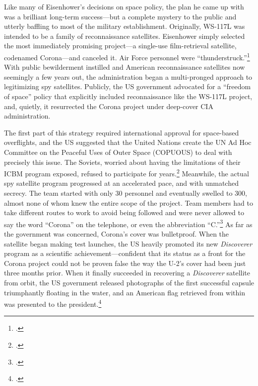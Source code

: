 \documentclass{memoir}
\begin{document}
Like many of Eisenhower's decisions on space policy, the plan he came up with was a brilliant long-term success---but a complete mystery to the public and utterly baffling to most of the military establishment. Originally, WS-117L was intended to be a family of reconnaissance satellites. Eisenhower simply selected the most immediately promising project---a single-use film-retrieval satellite, codenamed Corona---and canceled it. Air Force personnel were ``thunderstruck.''\footcite[p.~45]{peebles_corona_1997} With public bewilderment instilled and American reconnaissance satellites now seemingly a few years out, the administration began a multi-pronged approach to legitimizing spy satellites. Publicly, the US government advocated for a ``freedom of space'' policy that explicitly included reconnaissance like the WS-117L project, and, quietly, it resurrected the Corona project under deep-cover CIA administration.

The first part of this strategy required international approval for space-based overflights, and the US suggested that the United Nations create the UN Ad Hoc Committee on the Peaceful Uses of Outer Space (COPUOUS) to deal with precisely this issue. The Soviets, worried about having the limitations of their ICBM program exposed, refused to participate for years.\footcite[p.~140]{day_eye_2015} Meanwhile, the actual spy satellite program progressed at an accelerated pace, and with unmatched secrecy. The team started with only 30 personnel and eventually swelled to 300, almost none of whom knew the entire scope of the project. Team members had to take different routes to work to avoid being followed and were never allowed to say the word ``Corona'' on the telephone, or even the abbreviation ``C.''\footcite[p.~51]{peebles_shadow_2000} As far as the government was concerned, Corona's cover was bulletproof. When the satellite began making test launches, the US heavily promoted its new \emph{Discoverer} program as a scientific achievement---confident that its status as a front for the Corona project could not be proven false the way the U-2's cover had been just three months prior. When it finally succeeded in recovering a \emph{Discoverer} satellite from orbit, the US government released photographs of the first successful capsule triumphantly floating in the water, and an American flag retrieved from within was presented to the president.\footcite[p.~83]{peebles_shadow_2000}
\end{document}
